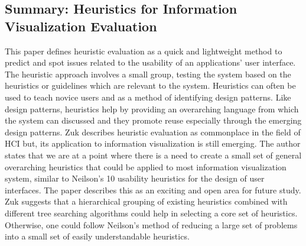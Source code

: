 \documentclass{sig-alternate}
\begin{document}
\subsection{Summary: Heuristics for Information Visualization Evaluation
\cite{Zuk:2006:HeuristicsForInformationVisualizationEvaluation}} This paper
defines heuristic evaluation as a quick and lightweight method to predict and
spot issues related to the usability of an applications' user interface. The
heuristic approach involves a small group, testing the system based on the
heuristics or guidelines which are relevant to the system. Heuristics can often
be used to teach novice users and as a method of identifying design patterns.
Like design patterns, heuristics help by providing an overarching language from
which the system can discussed and they promote reuse especially through the
emerging design patterns. Zuk describes heuristic evaluation as commonplace
in the field of HCI but, its application to information visualization is still
emerging.  The author states that we are at a point where there is a need to
create a small set of general  overarching heuristics that could be applied to
most information visualization system, similar to Neilson's 10 usability
heuristics for the design of user interfaces. The paper describes this as an
exciting and open area for future study. Zuk suggests  that a hierarchical
grouping of existing heuristics combined with different tree searching
algorithms could help in selecting a core set of heuristics. Otherwise,  one
could follow Neilson's method of reducing a large set of problems into a small
set of easily understandable heuristics. 
\end{document}
